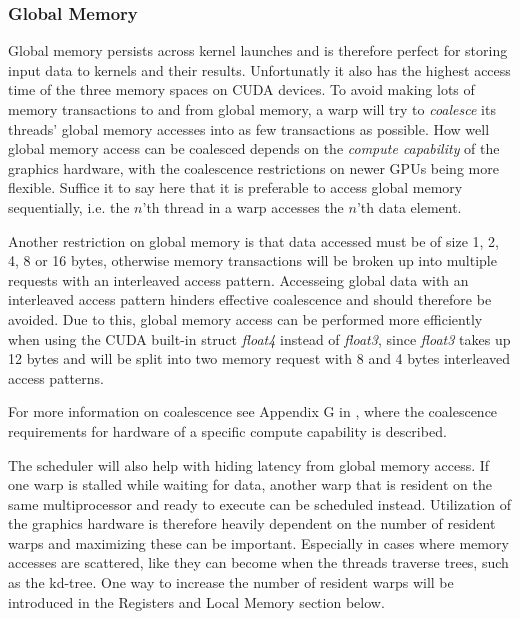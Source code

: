 \subsubsection{Global Memory}


Global memory persists across kernel launches and is therefore perfect for
storing input data to kernels and their results. Unfortunatly it also has the
highest access time of the three memory spaces on CUDA devices. To avoid making
lots of memory transactions to and from global memory, a warp will try to
\textit{coalesce} its threads' global memory accesses into as few transactions
as possible. How well global memory access can be coalesced depends on the
\textit{compute capability} of the graphics hardware, with the coalescence
restrictions on newer GPUs being more flexible. Suffice it to say here that it
is preferable to access global memory sequentially, i.e. the $n$'th thread in a
warp accesses the $n$'th data element.


Another restriction on global memory is that data accessed must be of size 1, 2,
4, 8 or 16 bytes, otherwise memory transactions will be broken up into multiple
requests with an interleaved access pattern. Accesseing global data with an
interleaved access pattern hinders effective coalescence and should therefore
be avoided. Due to this, global memory access can be performed more efficiently
when using the CUDA built-in struct \textit{float4} instead of \textit{float3},
since \textit{float3} takes up 12 bytes and will be split into two memory
request with 8 and 4 bytes interleaved access patterns.

For more information on coalescence see Appendix G in , where
the coalescence requirements for hardware of a specific compute capability is
described.


The scheduler will also help with hiding latency from global memory access. If
one warp is stalled while waiting for data, another warp that is resident on the
same multiprocessor and ready to execute can be scheduled instead. Utilization
of the graphics hardware is therefore heavily dependent on the number of
resident warps and maximizing these can be important. Especially in cases where
memory accesses are scattered, like they can become when the threads traverse
trees, such as the kd-tree. One way to increase the number of resident warps
will be introduced in the Registers and Local Memory section below.

